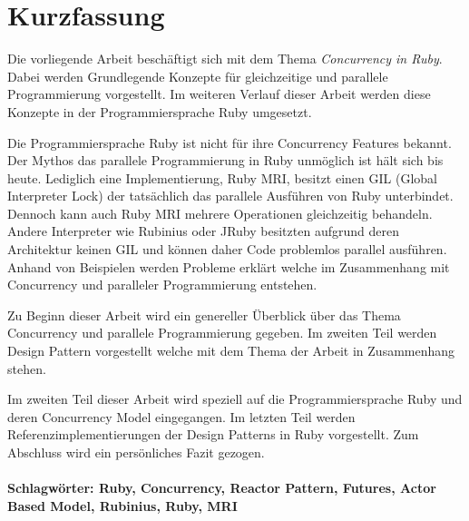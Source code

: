 \section*{Kurzfassung}
\vspace{0.5cm}

Die vorliegende Arbeit beschäftigt sich mit dem Thema \emph{Concurrency in Ruby}. Dabei werden Grundlegende Konzepte für gleichzeitige und parallele Programmierung vorgestellt. Im weiteren Verlauf dieser Arbeit werden diese Konzepte in der Programmiersprache Ruby umgesetzt. 

Die Programmiersprache Ruby ist nicht für ihre Concurrency Features bekannt. Der Mythos das parallele Programmierung in Ruby unmöglich ist hält sich bis heute. Lediglich eine Implementierung, Ruby MRI, besitzt einen GIL (Global Interpreter Lock) der tatsächlich das parallele Ausführen von Ruby unterbindet. Dennoch kann auch Ruby MRI mehrere Operationen gleichzeitig behandeln.  Andere Interpreter wie Rubinius oder JRuby besitzten aufgrund deren Architektur keinen GIL und können daher Code problemlos parallel ausführen. Anhand von Beispielen werden Probleme erklärt welche im Zusammenhang mit Concurrency und paralleler Programmierung entstehen. 

Zu Beginn dieser Arbeit wird ein genereller Überblick über das Thema Concurrency und parallele Programmierung  gegeben. Im zweiten Teil werden Design Pattern vorgestellt welche mit dem Thema der Arbeit in Zusammenhang stehen. 

Im zweiten Teil dieser Arbeit wird speziell auf die Programmiersprache Ruby und deren Concurrency Model eingegangen. Im letzten Teil werden Referenzimplementierungen der Design Patterns in Ruby vorgestellt. Zum Abschluss wird ein persönliches Fazit gezogen.


\paragraph{Schlagwörter: Ruby, Concurrency, Reactor Pattern, Futures, Actor Based Model, Rubinius, Ruby, MRI}